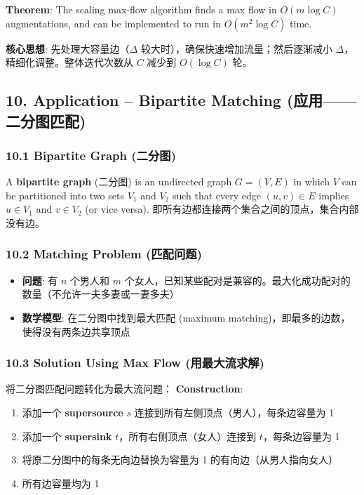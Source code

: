 \documentclass[10pt,a4paper,openany]{ctexbook}
\theoremstyle{definition}
\theoremstyle{remark}
\renewenvironment{quote}
  {\list{}{\leftmargin=1em\rightmargin=0pt\topsep=0.5pt\partopsep=0pt}\item[]}
  {\endlist}
\begin{document}
\textbf{Theorem}: The scaling max-flow algorithm finds a max flow in $O(m \log C)$ augmentations, and can be implemented to run in $O(m^2 \log C)$ time.
\begin{quote}
\textbf{核心思想}: 先处理大容量边（$\Delta$ 较大时），确保快速增加流量；然后逐渐减小 $\Delta$，精细化调整。整体迭代次数从 $C$ 减少到 $O(\log C)$ 轮。

\end{quote}
\vspace{-2pt}

\subsection{10. Application – Bipartite Matching (应用——二分图匹配)}

\subsubsection{10.1 Bipartite Graph (二分图)}

A \textbf{bipartite graph} (二分图) is an undirected graph $G = (V, E)$ in which $V$ can be partitioned into two sets $V_1$ and $V_2$ such that every edge $(u, v) \in E$ implies $u \in V_1$ and $v \in V_2$ (or vice versa).
即所有边都连接两个集合之间的顶点，集合内部没有边。
\subsubsection{10.2 Matching Problem (匹配问题)}

\begin{itemize}
\item \textbf{问题}: 有 $n$ 个男人和 $m$ 个女人，已知某些配对是兼容的。最大化成功配对的数量（不允许一夫多妻或一妻多夫）
\item \textbf{数学模型}: 在二分图中找到最大匹配 (maximum matching)，即最多的边数，使得没有两条边共享顶点

\end{itemize}

\subsubsection{10.3 Solution Using Max Flow (用最大流求解)}

将二分图匹配问题转化为最大流问题：
\textbf{Construction}:
\begin{enumerate}
\item 添加一个 \textbf{supersource} $s$ 连接到所有左侧顶点（男人），每条边容量为 1
\item 添加一个 \textbf{supersink} $t$，所有右侧顶点（女人）连接到 $t$，每条边容量为 1
\item 将原二分图中的每条无向边替换为容量为 1 的有向边（从男人指向女人）
\item 所有边容量均为 1

\end{enumerate}
\end{document}
